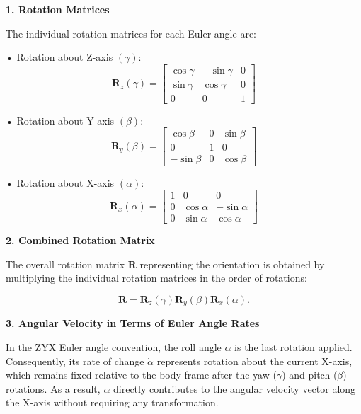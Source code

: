 \documentclass[12pt]{article}
\begin{document}
\vspace{0.5cm}

\textbf{1. Rotation Matrices}

The individual rotation matrices for each Euler angle are:

• Rotation about Z-axis \((\gamma)\):
\begin{equation}
\label{eq:R_z}
\mathbf{R}_z(\gamma) =
\begin{bmatrix}
\cos\gamma & -\sin\gamma & 0 \\
\sin\gamma & \cos\gamma & 0 \\
0 & 0 & 1
\end{bmatrix}
\end{equation}

• Rotation about Y-axis \((\beta)\):
\begin{equation}
\label{eq:R_y}
\mathbf{R}_y(\beta) =
\begin{bmatrix}
\cos\beta & 0 & \sin\beta \\
0 & 1 & 0 \\
-\sin\beta & 0 & \cos\beta
\end{bmatrix}
\end{equation}

• Rotation about X-axis \((\alpha)\):
\begin{equation}
\label{eq:R_x}
\mathbf{R}_x(\alpha) =
\begin{bmatrix}
1 & 0 & 0 \\
0 & \cos\alpha & -\sin\alpha \\
0 & \sin\alpha & \cos\alpha
\end{bmatrix}
\end{equation}

\textbf{2. Combined Rotation Matrix}

The overall rotation matrix $\mathbf{R}$ representing the orientation is obtained by multiplying the individual rotation matrices in the order of rotations:

\begin{equation}
\label{eq:R_total}
\mathbf{R} = \mathbf{R}_z(\gamma) \mathbf{R}_y(\beta) \mathbf{R}_x(\alpha) .
\end{equation}

\vspace{0.5cm}

\textbf{3. Angular Velocity in Terms of Euler Angle Rates}

In the ZYX Euler angle convention, the roll angle $\alpha$ is the last rotation applied. Consequently, its rate of change $\dot{\alpha}$ represents rotation about the current X-axis, which remains fixed relative to the body frame after the yaw ($\gamma$) and pitch ($\beta$) rotations. As a result, $\dot{\alpha}$ directly contributes to the angular velocity vector along the X-axis without requiring any transformation.
\end{document}

